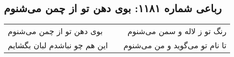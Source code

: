 \begin{center}
\section*{رباعی شماره ۱۱۸۱: بوی دهن تو از چمن می‌شنوم}
\label{sec:1181}
\begin{longtable}{l p{0.5cm} r}
بوی دهن تو از چمن می‌شنوم
&&
رنگ تو ز لاله و سمن می‌شنوم
\\
این هم چو نباشدم لبان بگشایم
&&
تا نام تو می‌گوید و من می‌شنوم
\\
\end{longtable}
\end{center}
